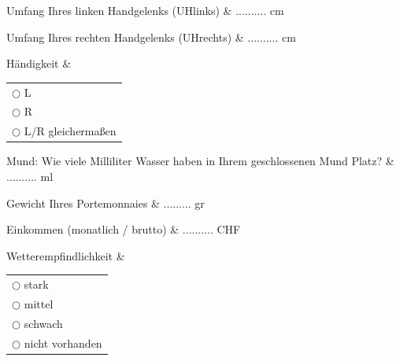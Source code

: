 \begin{befrage}
 Umfang Ihres linken Handgelenks (UHlinks)  & .......... cm
\end{befrage}

\begin{befrage}
 Umfang Ihres rechten Handgelenks (UHrechts)  & .......... cm
\end{befrage}

\begin{befrage}
 Händigkeit  &
 \begin{tabular}[t]{l}
   $\bigcirc$ L\\
   $\bigcirc$ R\\
   $\bigcirc$ L/R gleichermaßen\\
   \end{tabular}
\end{befrage}

\begin{befrage}
  Mund: Wie viele Milliliter Wasser haben in Ihrem geschlossenen Mund Platz? & .......... ml
\end{befrage}

\begin{befrage}
  Gewicht Ihres Portemonnaies & ......... gr
\end{befrage}

\begin{befrage}
 Einkommen (monatlich / brutto) & .......... CHF
\end{befrage}

\begin{befrage}
 Wetterempfindlichkeit &
 \begin{tabular}[t]{l}
   $\bigcirc$ stark\\
   $\bigcirc$ mittel\\
   $\bigcirc$ schwach\\
   $\bigcirc$ nicht vorhanden\\
   \end{tabular}
\end{befrage}



